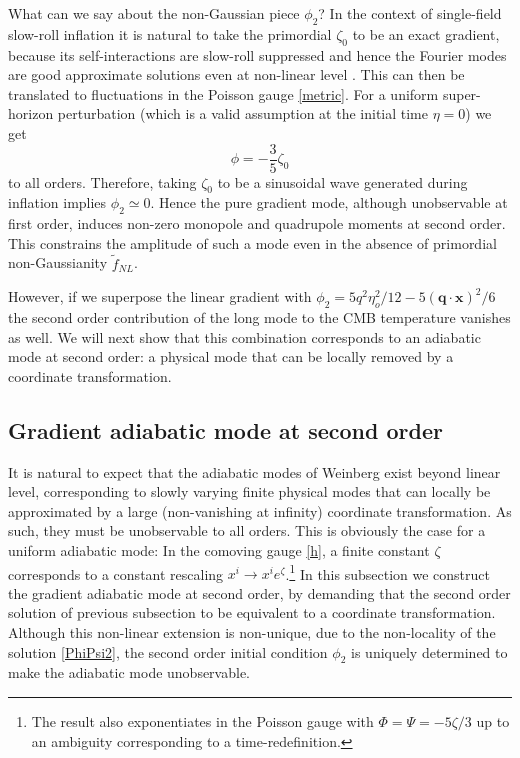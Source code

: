 \documentclass[12pt]{article}
\numberwithin{equation}{section}
\def\bsb{\boldsymbol}
\def\be{\begin{equation}}
\def\ee{\end{equation}}
\begin{document}
What can we say about the non-Gaussian piece $\phi_2$? In the context of single-field slow-roll inflation it is natural to take the primordial $\zeta_0$ to be an exact gradient, because its self-interactions are slow-roll suppressed and hence the Fourier modes are good approximate solutions even at non-linear level \cite{Maldacena}. This can then be translated to fluctuations in the Poisson gauge \eqref{metric}. For a uniform super-horizon perturbation (which is a valid assumption at the initial time $\eta =0$) we get
\be
\phi = -\frac{3}{5}\zeta_0
\ee
to all orders. Therefore, taking $\zeta_0$ to be a sinusoidal wave generated during inflation implies $\phi_2\simeq 0$. Hence the pure gradient mode, although unobservable at first order, induces non-zero monopole and quadrupole moments at second order. This constrains the amplitude of such a mode even in the absence of primordial non-Gaussianity $\tilde f_{NL}$.

However, if we superpose the linear gradient with $\phi_2 = 5q^2\eta_o^2/12 -5 (\bsb q\cdot \bsb x)^2/6$ the second order contribution of the long mode to the CMB temperature vanishes as well. We will next show that this combination corresponds to an adiabatic mode at second order: a physical mode that can be locally removed by a coordinate transformation.
 
\subsection{Gradient adiabatic mode at second order\label{2nd}}

It is natural to expect that the adiabatic modes of Weinberg exist beyond linear level, corresponding to slowly varying finite physical modes that can locally be approximated by a large (non-vanishing at infinity) coordinate transformation. As such, they must be unobservable to all orders. This is obviously the case for a uniform adiabatic mode: In the comoving gauge \eqref{h}, a finite constant $\zeta$ corresponds to a constant rescaling $x^i\to x^i e^{\zeta}$.\footnote{The result also exponentiates in the Poisson gauge with $\Phi=\Psi = -5\zeta/3$ up to an ambiguity corresponding to a time-redefinition.} In this subsection we construct the gradient adiabatic mode at second order, by demanding that the second order solution of previous subsection to be equivalent to a coordinate transformation. Although this non-linear extension is non-unique, due to the non-locality of the solution \eqref{PhiPsi2}, the second order initial condition $\phi_2$ is uniquely determined to make the adiabatic mode unobservable.
\end{document}
